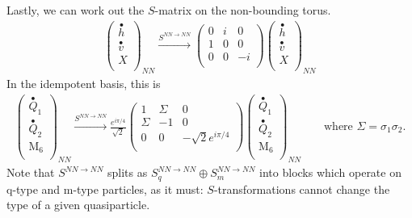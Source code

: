 \documentclass[12pt,a4paper]{article}
\newcounter{arrow}
\newcommand{\ra}{\rightarrow}
\begin{document}
Lastly, we can work out the $S$-matrix on the non-bounding torus.
\begin{align}
\left( \begin{matrix}
\stackrel{\bullet}{h} \\
\stackrel{\bullet}{v} \\
X \\
\end{matrix} \right)_{NN}
\xrightarrow{S^{NN\rightarrow NN}} 
\left( \begin{matrix}
0&i  &0 \\ 
1&0 &0 \\
0&0& -i \\
\end{matrix} \right)
\left( \begin{matrix}
\stackrel{\bullet}{h} \\
\stackrel{\bullet}{v} \\
X \\\end{matrix} \right)_{NN}
\end{align}
In the idempotent basis, this is
\begin{align}
\left( \begin{matrix}
\stackrel{\bullet}{Q}_{1}\\
\stackrel{\bullet}{Q}_{2}\\
\text{M}_6 \\ 
\end{matrix} \right)_{NN}
 \xrightarrow{S^{NN \rightarrow NN}}
\frac{e^{i \pi /4}}{\sqrt{2}}\left( \begin{matrix} 
1&\Sigma &0 \\
\Sigma &-1&0\\
0&0& -\sqrt{2} e^{i \pi /4}\\
\end{matrix} \right)
\left( \begin{matrix}
\stackrel{\bullet}{Q}_{1}\\
\stackrel{\bullet}{Q}_{2}\\
\text{M}_6 \\ 
\end{matrix} \right)_{NN}
\quad \quad \text{where $\Sigma = \sigma_1 \sigma_2$.}
\end{align}
Note that $S^{NN\ra NN}$ splits as $S^{NN\ra NN}_q \oplus S^{NN\ra NN}_m$ into blocks which operate 
on q-type and m-type particles, as it must: $S$-transformations cannot change the type of a given 
quasiparticle. 
\end{document}
